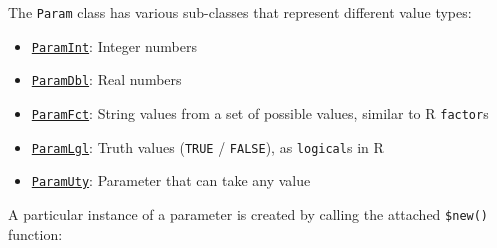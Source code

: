 \documentclass[
]{scrbook}
\newenvironment{Shaded}{\begin{snugshade}}{\end{snugshade}}
\newcommand{\AttributeTok}[1]{\textcolor[rgb]{0.77,0.63,0.00}{#1}}
\newcommand{\ConstantTok}[1]{\textcolor[rgb]{0.00,0.00,0.00}{#1}}
\newcommand{\ControlFlowTok}[1]{\textcolor[rgb]{0.13,0.29,0.53}{\textbf{#1}}}
\newcommand{\DecValTok}[1]{\textcolor[rgb]{0.00,0.00,0.81}{#1}}
\newcommand{\FunctionTok}[1]{\textcolor[rgb]{0.00,0.00,0.00}{#1}}
\newcommand{\NormalTok}[1]{#1}
\newcommand{\OtherTok}[1]{\textcolor[rgb]{0.56,0.35,0.01}{#1}}
\newcommand{\SpecialCharTok}[1]{\textcolor[rgb]{0.00,0.00,0.00}{#1}}
\newcommand{\StringTok}[1]{\textcolor[rgb]{0.31,0.60,0.02}{#1}}
\providecommand{\tightlist}{%
  \setlength{\itemsep}{0pt}\setlength{\parskip}{0pt}}
\renewenvironment{Shaded} {\begin{snugshade}\small} {\end{snugshade}}
\begin{document}
The \texttt{Param} class has various sub-classes that represent different value types:

\begin{itemize}
\tightlist
\item
  \href{https://paradox.mlr-org.com/reference/ParamInt.html}{\texttt{ParamInt}}: Integer numbers
\item
  \href{https://paradox.mlr-org.com/reference/ParamDbl.html}{\texttt{ParamDbl}}: Real numbers
\item
  \href{https://paradox.mlr-org.com/reference/ParamFct.html}{\texttt{ParamFct}}: String values from a set of possible values, similar to R \texttt{factor}s
\item
  \href{https://paradox.mlr-org.com/reference/ParamLgl.html}{\texttt{ParamLgl}}: Truth values (\texttt{TRUE} / \texttt{FALSE}), as \texttt{logical}s in R
\item
  \href{https://paradox.mlr-org.com/reference/ParamUty.html}{\texttt{ParamUty}}: Parameter that can take any value
\end{itemize}

A particular instance of a parameter is created by calling the attached \texttt{\$new()} function:

\begin{Shaded}
\end{Shaded}
\end{document}
